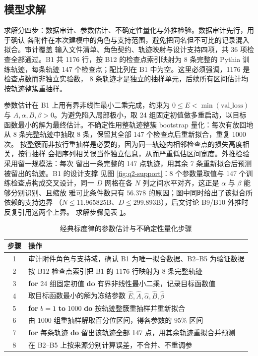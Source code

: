\documentclass[bwprint]{gmcmthesis}
\numberwithin{equation}{section}
\numberwithin{figure}{section}
\numberwithin{table}{section}
\begin{document}
\subsection{模型求解}

求解分四步：数据审计、参数估计、不确定性量化与外推检验。数据审计先行，用于确认
各附件在本次建模中的角色与支持范围，避免把同名但不可比的记录混入拟合。审计覆盖
输入文件清单、角色契约、轨迹映射与设计支持四项，共 36 项检查全部通过。B1 共
1176 行，按 B12 的检查点索引映射为 8 条完整的 Pythia 训练轨迹，每条轨迹
147 个检查点；配比列在 B1 中为空。这里必须强调，1176 是检查点数而非独立实验数，
8 条轨迹才是独立的抽样单元，后续所有区间估计均按轨迹整簇重抽样。

参数估计在 B1 上用有界非线性最小二乘完成，约束为 $0\le E<\min(\mathrm{val\_loss})$
与 $A,\alpha,B,\beta>0$。为避免陷入局部极小，取 24 组固定初值做多重启动，以目标
函数最小的解为最终估计。不确定性用整轨迹整簇 bootstrap 量化：每次有放回地
从 8 条完整轨迹中抽取 8 条，保留其全部 147 个检查点后重新拟合，重复 1000 次。
按整簇而非按行重抽样是必要的，因为同一轨迹内相邻检查点的损失高度相关，按行抽样
会把序列相关误当作独立信息，从而严重低估区间宽度。外推检验采用留一规模法：每次
留出一条完整的 147 点轨迹，用其余 7 条重新拟合后预测被留出的轨迹。B1 的设计支撑
见图 \ref{fig:q2-support}：8 个参数量取值与 147 个训练检查点构成交叉设计，同一
$D$ 网格在各 $N$ 列之间水平对齐，这正是 $\alpha$ 与 $\beta$ 能够分别识别、且缩放
雅可比条件数只有 $56.378$ 的原因；图中同时给出了该拟合所依赖的支持边界
（$N\le11.965825$B、$D\le299.893$B），后文讨论 B9/B10 外推时反复引用这两个上界。
求解步骤见表 \ref{alg:q2-solve}。

\begin{table}[htp!]
\centering
\renewcommand\arraystretch{1.2}
\caption{经典标度律的参数估计与不确定性量化步骤}\label{alg:q2-solve}
\begin{tabularx}{\textwidth}{cX}
\toprule
步骤 & 操作 \\
\midrule
1 & 审计附件角色与支持域，确认 B1 为唯一拟合数据、B2--B5 为验证数据 \\
2 & 按 B12 检查点索引把 B1 的 1176 行映射为 8 条完整轨迹 \\
3 & \textbf{for} 24 组固定初值 \textbf{do} 有界非线性最小二乘，记录目标函数值 \\
4 & 取目标函数最小的解为冻结参数 $\hat E,\hat A,\hat\alpha,\hat B,\hat\beta$ \\
5 & \textbf{for} $b=1$ \textbf{to} 1000 \textbf{do} 按轨迹整簇重抽样并重新拟合 \\
6 & 由 1000 组重抽样解取百分位区间，得各参数的 $95\%$ 区间 \\
7 & \textbf{for} 每条轨迹 \textbf{do} 留出该轨迹全部 147 点，用其余轨迹重拟合并预测 \\
8 & 在 B2--B5 上按来源分别计算误差，不合并、不重调参 \\
\bottomrule
\end{tabularx}
\end{table}
\end{document}

